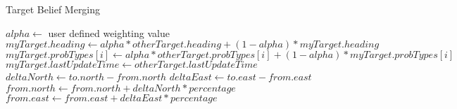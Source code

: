 \begin{algorithm}[H]
	\caption{Target Belief Merging}
	\label{alg:mergeTarget}
	\begin{algorithmic}[1]
		\State $alpha\gets $ user defined weighting value
			\State $myTarget.heading\gets alpha * otherTarget.heading + (1-alpha)*myTarget.heading$
			\State {}
				\State $myTarget.probTypes[i]\gets alpha * otherTarget.probTypes[i] + (1-alpha)*myTarget.probTypes[i]$
			\EndFor
			\State $myTarget.lastUpdateTime\gets otherTarget.lastUpdateTime$
		\EndIf
		\EndFunction
		\\
			\State $deltaNorth\gets to.north - from.north$
			\State $deltaEast\gets to.east - from.east$
			\State $from.north\gets from.north + deltaNorth * percentage$
			\State $from.east\gets from.east + deltaEast * percentage$
		\EndFunction
	\end{algorithmic}
\end{algorithm}

